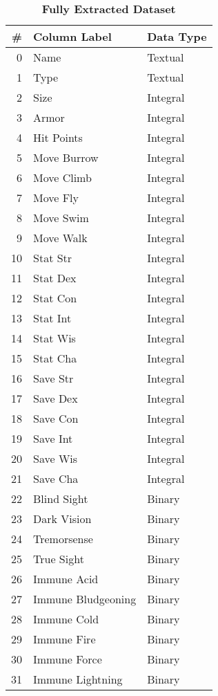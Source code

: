\documentclass[12pt]{diazessay}
\begin{document}
\begin{table}[ht]
	\caption{\bfseries Fully Extracted Dataset}
	\label{tab:fully-extracted-dataset}
\begin{tiny}
\begin{minipage}[b]{0.45\linewidth}\centering
\begin{tabular}{@{}rll@{}}
	\toprule
	\# & Column Label & Data Type \\
	\midrule
	0 & Name & Textual \\
	1 & Type & Textual \\
	2 & Size & Integral \\
	3 & Armor & Integral \\
	4 & Hit Points & Integral \\
	5 & Move Burrow & Integral \\
	6 & Move Climb & Integral \\
	7 & Move Fly & Integral \\
	8 & Move Swim & Integral \\
	9 & Move Walk & Integral \\
	10 & Stat Str & Integral \\
	11 & Stat Dex & Integral \\
	12 & Stat Con & Integral \\
	13 & Stat Int & Integral \\
	14 & Stat Wis & Integral \\
	15 & Stat Cha & Integral \\
	16 & Save Str & Integral \\
	17 & Save Dex & Integral \\
	18 & Save Con & Integral \\
	19 & Save Int & Integral \\
	20 & Save Wis & Integral \\
	21 & Save Cha & Integral \\
	22 & Blind Sight & Binary \\
	23 & Dark Vision & Binary \\
	24 & Tremorsense & Binary \\
	25 & True Sight & Binary \\
	26 & Immune Acid & Binary \\
	27 & Immune Bludgeoning & Binary \\
	28 & Immune Cold & Binary \\
	29 & Immune Fire & Binary \\
	30 & Immune Force & Binary \\
	31 & Immune Lightning & Binary \\

\end{tabular}
\end{minipage}
\end{tiny}
\end{table}
\end{document}
